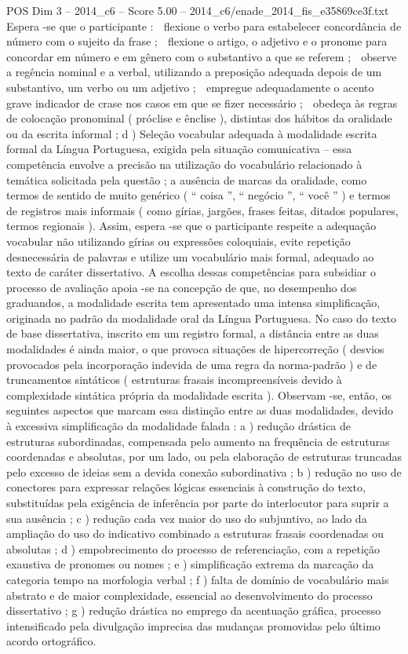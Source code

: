 \begin{textsample}{POS Dim 3 – 2014\_c6 – Score 5.00 – 2014\_c6/enade\_2014\_fis\_e35869ce3f.txt}
Espera -se que o participante :  flexione o verbo para estabelecer concordância de número com o sujeito da frase ;  flexione o artigo, o adjetivo e o pronome para concordar em número e em gênero com o substantivo a que se referem ;  observe a regência nominal e a verbal, utilizando a preposição adequada depois de um substantivo, um verbo ou um adjetivo ;  empregue adequadamente o acento grave indicador de crase nos casos em que se fizer necessário ;  obedeça às regras de colocação pronominal ( próclise e ênclise ), distintas dos hábitos da oralidade ou da escrita informal ; d ) Seleção vocabular adequada à modalidade escrita formal da Língua Portuguesa, exigida pela situação comunicativa – essa competência envolve a precisão na utilização do vocabulário relacionado à temática solicitada pela questão ; a ausência de marcas da oralidade, como termos de sentido de muito genérico ( “ coisa ”, “ negócio ”, “ você ” ) e termos de registros mais informais ( como gírias, jargões, frases feitas, ditados populares, termos regionais ).
Assim, espera -se que o participante respeite a adequação vocabular não utilizando gírias ou expressões coloquiais, evite repetição desnecessária de palavras e utilize um vocabulário mais formal, adequado ao texto de caráter dissertativo.
A escolha dessas competências para subsidiar o processo de avaliação apoia -se na concepção de que, no desempenho dos graduandos, a modalidade escrita tem apresentado uma intensa simplificação, originada no padrão da modalidade oral da Língua Portuguesa.
No caso do texto de base dissertativa, inscrito em um registro formal, a distância entre as duas modalidades é ainda maior, o que provoca situações de hipercorreção ( desvios provocados pela incorporação indevida de uma regra da norma-padrão ) e de truncamentos sintáticos ( estruturas frasais incompreensíveis devido à complexidade sintática própria da modalidade escrita ).
Observam -se, então, os seguintes aspectos que marcam essa distinção entre as duas modalidades, devido à excessiva simplificação da modalidade falada : a ) redução drástica de estruturas subordinadas, compensada pelo aumento na frequência de estruturas coordenadas e absolutas, por um lado, ou pela elaboração de estruturas truncadas pelo excesso de ideias sem a devida conexão subordinativa ; b ) redução no uso de conectores para expressar relações lógicas essenciais à construção do texto, substituídas pela exigência de inferência por parte do interlocutor para suprir a sua ausência ; c ) redução cada vez maior do uso do subjuntivo, ao lado da ampliação do uso do indicativo combinado a estruturas frasais coordenadas ou absolutas ; d ) empobrecimento do processo de referenciação, com a repetição exaustiva de pronomes ou nomes ; e ) simplificação extrema da marcação da categoria tempo na morfologia verbal ; f ) falta de domínio de vocabulário mais abstrato e de maior complexidade, essencial ao desenvolvimento do processo dissertativo ; g ) redução drástica no emprego da acentuação gráfica, processo intensificado pela divulgação imprecisa das mudanças promovidas pelo último acordo ortográfico.

\end{textsample}
